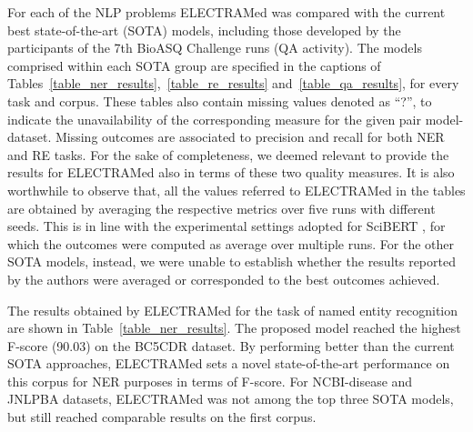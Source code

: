\documentclass{article}
\begin{document}
For each of the NLP problems ELECTRAMed was compared with the current best state-of-the-art (SOTA) models, including those developed by the participants of the 7th BioASQ Challenge runs (QA activity).
The models comprised within each SOTA group are specified in the captions of Tables~\ref{table_ner_results},~\ref{table_re_results} and~\ref{table_qa_results}, for every task and corpus.
These tables also contain missing values denoted as ``?'', to indicate the unavailability of the corresponding measure for the given pair model-dataset.
Missing outcomes are associated to precision and recall for both NER and RE tasks.
For the sake of completeness, we deemed relevant to provide the results for ELECTRAMed also in terms of these two quality measures.
It is also worthwhile to observe that, all the values referred to ELECTRAMed in the tables are obtained by averaging the respective metrics over five runs with different seeds.
This is in line with the experimental settings adopted for SciBERT \citep{Beltagy19}, for which the outcomes were computed as average over multiple runs. 
For the other SOTA models, instead, we were unable to establish whether the results reported by the authors were averaged or corresponded to the best outcomes achieved.

The results obtained by ELECTRAMed for the task of named entity recognition are shown in Table~\ref{table_ner_results}.
The proposed model reached the highest F-score (90.03) on the BC5CDR dataset.
By performing better than the current SOTA approaches, ELECTRAMed sets a novel state-of-the-art performance on this corpus for NER purposes in terms of F-score.
For NCBI-disease and JNLPBA datasets, ELECTRAMed was not among the top three SOTA models, but still reached  comparable results on the first corpus.
\end{document}
